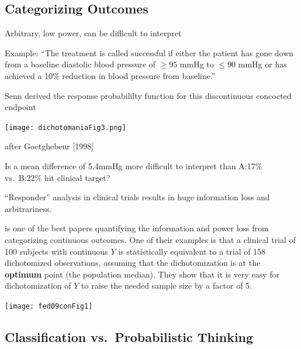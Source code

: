 \subsection{Categorizing Outcomes}\label{sec:info-catoutcomes}
\bi
\item Arbitrary, low power, can be difficult to interpret
\item Example: ``The treatment is called successful if either the
  patient has gone down from a baseline diastolic blood pressure of
  $\geq 95$ mmHg to $\leq 90$ mmHg or has achieved a 10\% reduction in
  blood pressure from baseline.''
\item Senn derived the response probabililty function for this
  discontinuous concocted endpoint
\ei

\centerline{\texttt{[image: dichotomaniaFig3.png]}}
\citet{sen05dic} after Goetghebeur [1998]

Is a mean difference of 5.4mmHg more difficult to interpret than
A:17\% vs.\ B:22\% hit clinical target?

``Responder'' analysis in clinical trials results in huge information loss
and arbitrariness.

\citet{fed09con} is one of the best papers quantifying the information
and power loss from categorizing continuous outcomes.  One of their
examples is that a clinical trial of 100 subjects with continuous $Y$
is statistically equivalent to a trial of 158 dichotomized
observations, assuming that the dichotomization is at the
\textbf{optimum} point (the population median).  They show that it is
very easy for dichotomization of $Y$ to raise the needed sample size
by a factor of 5.

\centerline{\texttt{[image: fed09conFig1]}}\label{pg:info-fed09con}
\citet{fed09con}


\subsection{Classification vs.\ Probabilistic Thinking}%

